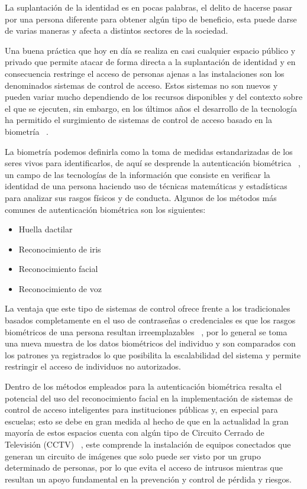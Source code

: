 La suplantación de la identidad es en pocas palabras, el delito de hacerse pasar por una persona diferente para obtener algún tipo de beneficio, esta puede darse de varias maneras y afecta a distintos sectores de la sociedad.


Una buena práctica que hoy en día se realiza en casi cualquier espacio público y privado que permite atacar de forma directa a la suplantación de identidad y en consecuencia restringe el acceso de personas ajenas a las instalaciones son los denominados sistemas de control de acceso. Estos sistemas no son nuevos y pueden variar mucho dependiendo de los recursos disponibles y del contexto sobre el que se ejecuten, sin embargo, en los últimos años el desarrollo de la tecnología ha permitido el surgimiento de sistemas de control de acceso basado en la biometría ~\cite{CALF}.

La biometría podemos definirla como la toma de medidas estandarizadas de los seres vivos para identificarlos, de aquí se desprende la autenticación biométrica ~\cite{CALF}, un campo de las tecnologías de la información que consiste en verificar la identidad de una persona haciendo uso de técnicas matemáticas y estadísticas para analizar sus rasgos físicos y de conducta. Algunos de los métodos más comunes de autenticación biométrica son los siguientes:

\begin{itemize}
    \item Huella dactilar
    \item Reconocimiento de iris
    \item Reconocimiento facial
    \item Reconocimiento de voz
\end{itemize}

La ventaja que este tipo de sistemas de control ofrece frente a los tradicionales basados completamente en el uso de contraseñas o credenciales es que los rasgos biométricos de una persona resultan irreemplazables ~\cite{CALF}, por lo general se toma una nueva muestra de los datos biométricos del individuo y son comparados con los patrones ya registrados lo que posibilita la escalabilidad del sistema y permite restringir el acceso de individuos no autorizados.

Dentro de los métodos empleados para la autenticación biométrica resalta el potencial del uso del reconocimiento facial en la implementación de sistemas de control de acceso inteligentes para instituciones públicas y, en especial para escuelas; esto se debe en gran medida al hecho de que en la actualidad la gran mayoría de estos espacios cuenta con algún tipo de Circuito Cerrado de Televisión (CCTV) ~\cite{FacialR}, este comprende la instalación de equipos conectados que generan un circuito de imágenes que solo puede ser visto por un grupo determinado de personas, por lo que evita el acceso de intrusos mientras que resultan un apoyo fundamental en la prevención y control de pérdida y riesgos.

